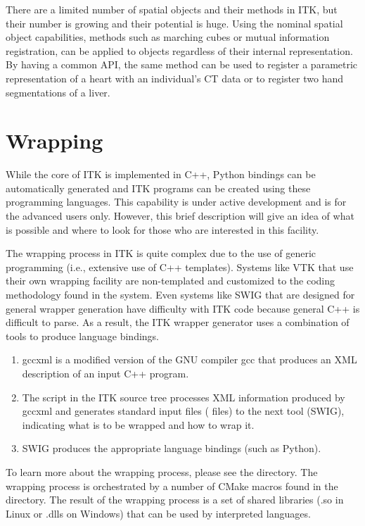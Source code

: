 There are a limited number of spatial objects and their methods in ITK, but
their number is growing and their potential is huge. Using the nominal
spatial object capabilities, methods such as marching cubes or mutual
information registration, can be applied to objects regardless of their
internal representation. By having a common API, the same method can be used
to register a parametric representation of a heart with an individual's CT
data or to register two hand segmentations of a liver.


\section{Wrapping}
\label{sec:Wrapping}


While the core of ITK is implemented in C++, Python bindings can be
automatically generated and ITK programs can be created using these
programming languages. This capability is under active development and is for
the advanced users only. However, this brief description will give an idea
of what is possible and where to look for those who are interested in this facility.

The wrapping process in ITK is quite complex due to the use of generic
programming (i.e., extensive use of C++ templates). Systems like VTK that use
their own wrapping facility are non-templated and customized to the coding
methodology found in the system. Even systems like SWIG that are designed
for general wrapper generation have difficulty with ITK code because general
C++ is difficult to parse. As a result, the ITK wrapper generator uses a
combination of tools to produce language bindings.

\begin{enumerate}
  \item gccxml is a modified version of the GNU compiler gcc that
    produces an XML description of an input C++ program.
  \item The  script in the ITK source tree processes XML
    information produced by gccxml and generates standard input files
    ( files) to the next tool (SWIG), indicating what is to be wrapped
    and how to wrap it.
  \item SWIG produces the appropriate language bindings (such as Python).
\end{enumerate}

To learn more about the wrapping process, please see the 
directory. The wrapping process is orchestrated by a number of CMake macros
found in the  directory.  The result of the wrapping process is
a set of shared libraries (.so in Linux or .dlls on Windows) that can be used
by interpreted languages.


